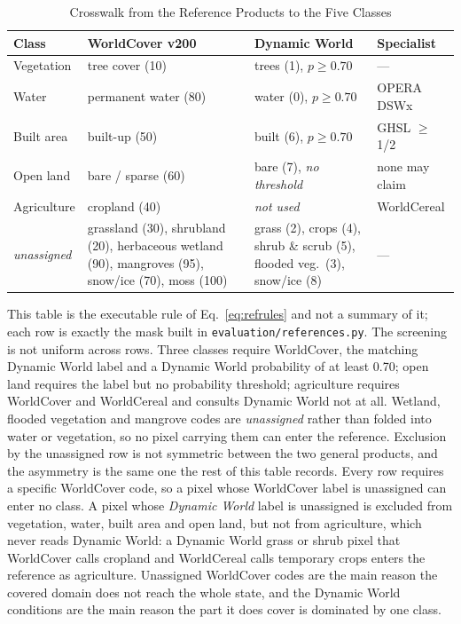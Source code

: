 \documentclass[conference]{IEEEtran}
\begin{document}
\begin{table}[!t]
\caption{Crosswalk from the Reference Products to the Five Classes}
\label{tab_crosswalk}
\begin{center}
\begin{tabular}{@{}L{2.2cm}L{5.4cm}L{4.2cm}L{4.6cm}@{}}
\toprule
\textbf{Class} & \textbf{WorldCover v200} & \textbf{Dynamic World} & \textbf{Specialist} \\
\midrule
Vegetation  & tree cover (10) & trees (1), $p\ge0.70$ & --- \\
Water       & permanent water (80) & water (0), $p\ge0.70$ & OPERA DSWx \\
Built area  & built-up (50) & built (6), $p\ge0.70$ & GHSL $\ge$ 1/2 \\
Open land   & bare / sparse (60) & bare (7), \emph{no threshold} & none may claim \\
Agriculture & cropland (40) & \emph{not used} & WorldCereal \\
\midrule
\emph{unassigned} & grassland (30), shrubland (20), herbaceous wetland (90), mangroves (95), snow/ice (70), moss (100) & grass (2), crops (4), shrub \& scrub (5), flooded veg.\ (3), snow/ice (8) & --- \\
\bottomrule
\end{tabular}

\vspace{2pt}
\parbox{\textwidth}{\footnotesize This table is the executable rule of Eq.~\eqref{eq:refrules} and not a summary of it; each row is exactly the mask built in \texttt{evaluation/references.py}. The screening is not uniform across rows. Three classes require WorldCover, the matching Dynamic World label and a Dynamic World probability of at least 0.70; open land requires the label but no probability threshold; agriculture requires WorldCover and WorldCereal and consults Dynamic World not at all. Wetland, flooded vegetation and mangrove codes are \emph{unassigned} rather than folded into water or vegetation, so no pixel carrying them can enter the reference. Exclusion by the unassigned row is not symmetric between the two general products, and the asymmetry is the same one the rest of this table records. Every row requires a specific WorldCover code, so a pixel whose WorldCover label is unassigned can enter no class. A pixel whose \emph{Dynamic World} label is unassigned is excluded from vegetation, water, built area and open land, but not from agriculture, which never reads Dynamic World: a Dynamic World grass or shrub pixel that WorldCover calls cropland and WorldCereal calls temporary crops enters the reference as agriculture. Unassigned WorldCover codes are the main reason the covered domain does not reach the whole state, and the Dynamic World conditions are the main reason the part it does cover is dominated by one class.}
\end{center}
\end{table}
\end{document}
